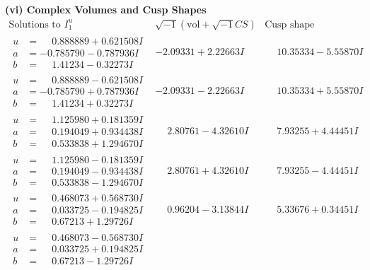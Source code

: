 \documentclass[1p]{elsarticle_modified}
\theoremstyle{definition}
\newcommand{\I}{\sqrt{-1}}
\begin{document}
\newpage\flushleft \textbf{(vi) Complex Volumes and Cusp Shapes}
$$\begin{array}{c|c|c}  
\text{Solutions to }I^u_{1}& \I (\text{vol} + \sqrt{-1}CS) & \text{Cusp shape}\\
 \hline 
\begin{aligned}
u &= \phantom{-}0.888889 + 0.621508 I \\
a &= -0.785790 - 0.787936 I \\
b &= \phantom{-}1.41234 - 0.32273 I\end{aligned}
 & -2.09331 + 2.22663 I & \phantom{-}10.35334 - 5.55870 I \\ \hline\begin{aligned}
u &= \phantom{-}0.888889 - 0.621508 I \\
a &= -0.785790 + 0.787936 I \\
b &= \phantom{-}1.41234 + 0.32273 I\end{aligned}
 & -2.09331 - 2.22663 I & \phantom{-}10.35334 + 5.55870 I \\ \hline\begin{aligned}
u &= \phantom{-}1.125980 + 0.181359 I \\
a &= \phantom{-}0.194049 + 0.934438 I \\
b &= \phantom{-}0.533838 + 1.294670 I\end{aligned}
 & \phantom{-}2.80761 - 4.32610 I & \phantom{-}7.93255 + 4.44451 I \\ \hline\begin{aligned}
u &= \phantom{-}1.125980 - 0.181359 I \\
a &= \phantom{-}0.194049 - 0.934438 I \\
b &= \phantom{-}0.533838 - 1.294670 I\end{aligned}
 & \phantom{-}2.80761 + 4.32610 I & \phantom{-}7.93255 - 4.44451 I \\ \hline\begin{aligned}
u &= \phantom{-}0.468073 + 0.568730 I \\
a &= \phantom{-}0.033725 - 0.194825 I \\
b &= \phantom{-}0.67213 + 1.29726 I\end{aligned}
 & \phantom{-}0.96204 - 3.13844 I & \phantom{-}5.33676 + 0.34451 I \\ \hline\begin{aligned}
u &= \phantom{-}0.468073 - 0.568730 I \\
a &= \phantom{-}0.033725 + 0.194825 I \\
b &= \phantom{-}0.67213 - 1.29726 I\end{aligned}

\end{array}$$
\end{document}
